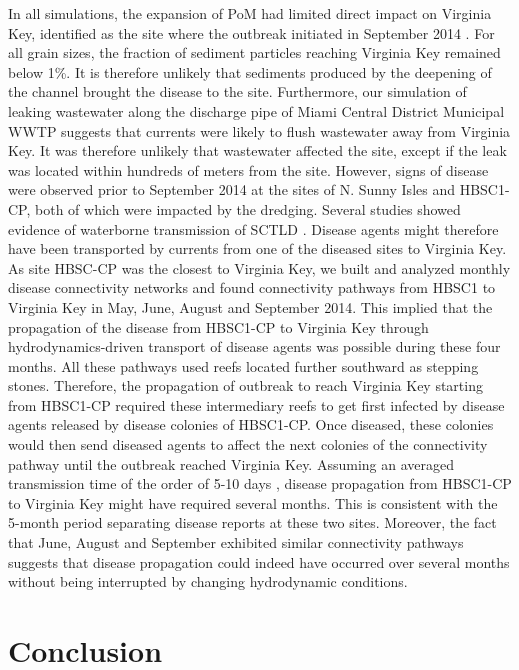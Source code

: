 In all simulations, the expansion of PoM had limited direct impact on Virginia Key, identified as the site where the outbreak initiated in September 2014 \citep{precht2016unprecedented}. For all grain sizes, the fraction of sediment particles reaching Virginia Key remained below 1\%. It is therefore unlikely that sediments produced by the deepening of the channel brought the disease to the site. Furthermore, our simulation of leaking wastewater along the discharge pipe of Miami Central District Municipal WWTP suggests that currents were likely to flush wastewater away from Virginia Key. It was therefore unlikely that wastewater affected the site, except if the leak was located within hundreds of meters from the site. However, signs of disease were observed prior to September 2014 at the sites of N. Sunny Isles and HBSC1-CP, both of which were impacted by the dredging. Several studies showed evidence of waterborne transmission of SCTLD \citep{aeby2019pathogenesis,dobbelaere2020coupled,eaton2021measuring,meiling2021variable}. Disease agents might therefore have been transported by currents from one of the diseased sites to Virginia Key. As site HBSC-CP was the closest to Virginia Key, we built and analyzed monthly disease connectivity networks and found connectivity pathways from HBSC1 to Virginia Key in May, June, August and September 2014. This implied that the propagation of the disease from HBSC1-CP to Virginia Key through hydrodynamics-driven transport of disease agents was possible during these four months. All these pathways used reefs located further southward as stepping stones. Therefore, the propagation of outbreak to reach Virginia Key starting from HBSC1-CP required these intermediary reefs to get first infected by disease agents released by disease colonies of HBSC1-CP. Once diseased, these colonies would then send diseased agents to affect the next colonies of the connectivity pathway until the outbreak reached Virginia Key. Assuming an averaged transmission time of the order of 5-10 days \citep{dobbelaere2020coupled}, disease propagation from HBSC1-CP to Virginia Key might have required several months. This is consistent with the 5-month period separating disease reports at these two sites. Moreover, the fact that June, August and September exhibited similar connectivity pathways suggests that disease propagation could indeed have occurred over several months without being interrupted by changing hydrodynamic conditions.

\section{Conclusion}

